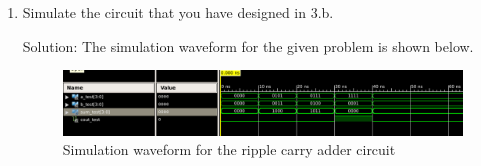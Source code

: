 \documentclass[table]{article}
\begin{document}
\begin{enumerate}
\begin{enumerate}[label=(\alph*)]
        \newpage

        \item Simulate the circuit that you have designed in 3.b.
        
        Solution: The simulation waveform for the given problem is shown below.

        \begin{figure}[H]
            \centering
            \includegraphics[width=\textwidth]{rca_sim.png}
            \caption{Simulation waveform for the ripple carry adder circuit}
            \label{fig:rcaSim}
        \end{figure}


    \end{enumerate}





    
\end{enumerate}
\end{document}
